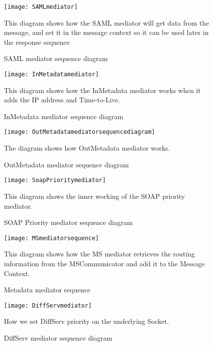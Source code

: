         \begin{figure}[H] 
            \centering
            \texttt{[image: SAMLmediator]}
            \caption{SAML mediator sequence diagram}
            This diagram shows how the SAML mediator will get data from the message, and set it in the message context so it can be used later in the response sequence
            \label{fig:SAMLmediator}
        \end{figure}
        
        \begin{figure}[H]
            \centering
            \texttt{[image: InMetadatamediator]}
            \caption{InMetadata mediator sequence diagram}
            This diagram shows how the InMetadata mediator works when it adds the IP address and Time-to-Live.
            \label{fig:InMetadatamediator}
        \end{figure}
        
        \begin{figure}[H]
            \centering
            \texttt{[image: OutMetadatamediatorsequencediagram]}
            \caption{OutMetadata mediator sequence diagram}
            The diagram shows how OutMetadata mediator works.
            \label{fig:OutMetadatamediatorsequencediagram}
        \end{figure}
        
        \begin{figure}[H] 
            \centering
            \texttt{[image: SoapPrioritymediator]}
            \caption{SOAP Priority mediator sequence diagram}
            This diagram shows the inner working of the SOAP priority mediator.
            \label{fig:SoapPrioritymediator}
        \end{figure}
    
        \begin{figure}[H] 
            \centering
            \texttt{[image: MSmediatorsequence]}
            \caption{Metadata mediator sequence}
            This diagram shows how the MS mediator retrieves the routing information from the MSCommunicator and add it to the Message Context.
            \label{fig:MSmediatorsequence}
        \end{figure}
        
        \begin{figure}[H]
            \centering
            \texttt{[image: DiffServmediator]}
            \caption{DiffServ mediator sequence diagram}
            How we set DiffServ priority on the underlying Socket.
            \label{fig:DiffServmediator}
        \end{figure}
        
